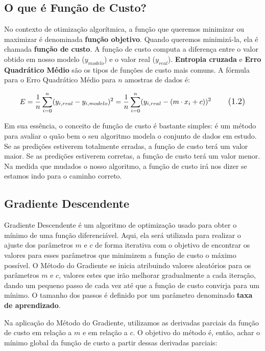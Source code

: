 \subsection{O que é Função de Custo?}
\label{sec:bt}

No contexto de otimização algorítmica, a função que queremos minimizar ou maximizar é denominada \textbf{função objetivo}. Quando queremos minimizá-la, ela é chamada \textbf{função de custo}. A função de custo computa a diferença entre o valor obtido em nosso modelo ($y_{modelo}$) e o valor real ($y_{real}$). \textbf{Entropia cruzada} e \textbf{Erro Quadrático Médio} são os tipos de funções de custo mais comuns. A fórmula para o Erro Quadrático Médio para $n$ amostras de dados é:

\begin{equation}
\large E=\frac{1}{n}\sum_{i=0}^{n}(y_{i,real} - y_{i,modelo})^{2} = \frac{1}{n}\sum_{i=0}^{n}(y_{i,real} - (m \cdot x_{i} + c))^{2}
\tag{1.2}
\end{equation}

Em sua essência, o conceito de função de custo é bastante simples: é um método para avaliar o quão bem o seu algoritmo modela o conjunto de dados em estudo. Se as predições estiverem totalmente erradas, a função de custo terá um valor maior. Se as predições estiverem corretas, a função de custo terá um valor menor. Na medida que mudados o nosso algoritmo, a função de custo irá nos dizer se estamos indo para o caminho correto.

\subsection{Gradiente Descendente}
Gradiente Descendente é um algoritmo de optimização usado para obter o mínimo de uma função diferenciável. Aqui, ela será utilizada para realizar o ajuste dos parâmetros $m$ e $c$ de forma iterativa com o objetivo de encontrar os valores para esses parâmetros que minimizem a função de custo o máximo possível. O Método do Gradiente se inicia atribuindo valores aleatórios para os parâmetros $m$ e $c$, valores estes que irão melhorar gradualmente a cada iteração, dando um pequeno passo de cada vez até que a função de custo convirja para um mínimo. O tamanho dos passos é definido por um parâmetro denominado \textbf{taxa de aprendizado}.

Na aplicação do Método do Gradiente, utilizamos as derivadas parciais da função de custo em relação a $m$ e em relação a $c$. O objetivo do método é, então, achar o mínimo global da função de custo a partir dessas derivadas parciais:

